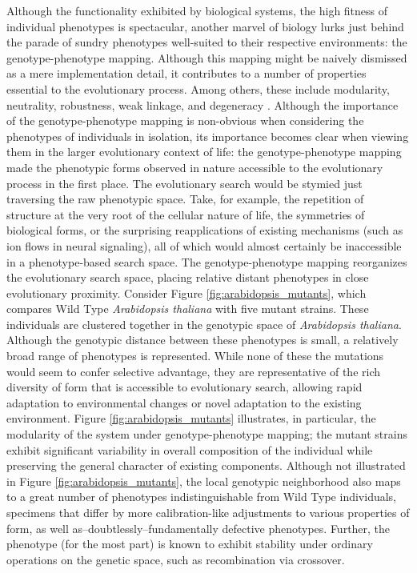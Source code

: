 \documentclass[a4paper]{article}
\begin{document}
Although the functionality exhibited by biological systems, the high fitness of individual phenotypes is spectacular, another marvel of biology lurks just behind the parade of sundry phenotypes well-suited to their respective environments: the genotype-phenotype mapping. Although this mapping might be naively dismissed as a mere implementation detail, it contributes to a number of properties essential to the evolutionary process. Among others, these include modularity, neutrality, robustness, weak linkage, and degeneracy \cite{Richter2015EvolvabilitySurvey, DowningIntelligenceSystems}. Although the importance of the genotype-phenotype mapping is non-obvious when considering the phenotypes of individuals in isolation, its importance becomes clear when viewing them in the larger evolutionary context of life: the genotype-phenotype mapping made the phenotypic forms observed in nature accessible to the evolutionary process in the first place. The evolutionary search would be stymied just traversing the raw phenotypic space. Take, for example, the repetition of structure at the very root of the cellular nature of life, the symmetries of biological forms, or the surprising  reapplications of existing mechanisms (such as ion flows in neural signaling), all of which would almost certainly be inaccessible in a phenotype-based search space. The genotype-phenotype mapping reorganizes the evolutionary search space, placing relative distant phenotypes in close evolutionary proximity. Consider Figure \ref{fig:arabidopsis_mutants}, which compares Wild Type \textit{Arabidopsis thaliana} with five mutant strains. These individuals are clustered together in the genotypic space of \textit{Arabidopsis thaliana}. Although the genotypic distance between these phenotypes is small, a relatively broad range of phenotypes is represented. While none of these the mutations would seem to confer selective advantage, they are representative of the rich diversity of form that is accessible to evolutionary search, allowing rapid adaptation to environmental changes or novel adaptation to the existing environment. Figure \ref{fig:arabidopsis_mutants} illustrates, in particular, the modularity of the system under genotype-phenotype mapping; the mutant strains exhibit significant variability in overall composition of the individual while preserving the general character of existing components. Although not illustrated in Figure \ref{fig:arabidopsis_mutants}, the local genotypic neighborhood also maps to a great number of phenotypes indistinguishable from Wild Type individuals, specimens that differ by more calibration-like adjustments to various properties of form, as well as--doubtlessly--fundamentally defective phenotypes. Further, the phenotype (for the most part) is known to exhibit stability under ordinary operations on the genetic space, such as recombination via crossover.
\end{document}
